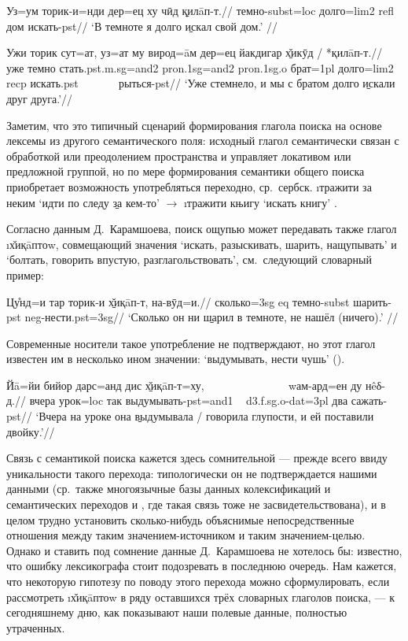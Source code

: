 \begingl
\gla {}Уз=ум торик-и=нди дер=ец ху чӣд \b{қилāп-т}.//
 темно-{\sc subst=loc} долго={\sc lim2} {\sc refl} дом искать-{\sc pst}//
\glft ‘В темноте я долго \b{искал} свой дом.’ //
\endgl \xe

\begingl
\gla Ужи торик сут=ат, уз=ат му вирод=āм дер=ец йакдигар \b{х̌икӯд} / *қилāп-т.//
\glc уже темно стать.{\sc pst.m.sg=and2} {\sc pron.1sg=and2} {\sc pron.1sg.o} брат={\sc 1pl} долго={\sc lim2} {\sc recp} искать.{\sc pst} ~~~~~~ рыться-{\sc pst}//
\glft ‘Уже стемнело, и мы с братом долго \b{искали} друг друга.’//
\endgl \xe

Заметим, что это типичный сценарий формирования глагола поиска на основе лексемы из другого семантического поля: исходный глагол семантически связан с обработкой или преодолением пространства и управляет локативом или предложной группой, но по мере формирования семантики общего поиска приобретает возможность употребляться переходно, ср.~сербск. \i{тражити за неким} ‘идти по следу \b{за} кем-то’ $\rightarrow$ \i{тражити књигу} ‘искать книгу’ \parencites{tolstaya2013}{ryzhova_stankovich2018}.

Согласно данным Д.~Карамшоева, поиск ощупью может передавать также глагол \i{х̌иқāптоw}, совмещающий значения ‘искать, разыскивать, шарить, нащупывать’ и ‘болтать, говорить впустую, разглагольствовать’, см.~следующий словарный пример:

\begingl
\gla Цу̊нд=и тар торик-и \b{х̌иқāп-т}, на-вӯд=и.//
\glc сколько={\sc 3sg} {\sc eq} темно-{\sc subst} шарить-{\sc pst} {\sc neg}-нести.{\sc pst=3sg}//
\glft ‘Сколько он ни \b{шарил} в темноте, не нашёл (ничего).’ //
\endgl \xe

Современные носители такое употребление не подтверждают, но этот глагол известен им в несколько ином значении: ‘выдумывать, нести чушь’ ().

\begingl
\gla Йā=йи бийор дарс=анд дис \b{х̌иқāп-т}=ху, ~~~~~~~~~~~~~~ wам-ард=ен ду нêδ-д.//
 вчера урок={\sc loc} так выдумывать-{\sc pst=and1} ~ {\sc d3.f.sg.o-dat=3pl} два сажать-{\sc pst}//
\glft ‘Вчера на уроке она \b{выдумывала} / говорила глупости, и ей поставили двойку.’//
\endgl \xe

Связь с семантикой поиска кажется здесь сомнительной — прежде всего ввиду уникальности такого перехода: типологически он не подтверждается нашими данными \parencite{eureka2018} (ср.~также многоязычные базы данных колексификаций и семантических переходов \parencite{clics2020} и \parencite{datsemshift}, где такая связь тоже не засвидетельствована), и в целом трудно установить сколько-нибудь объяснимые непосредственные отношения между таким значением-источником и таким значением-целью. Однако и ставить под сомнение данные Д.~Карамшоева не хотелось бы: известно, что ошибку лексикографа стоит подозревать в последнюю очередь. Нам кажется, что некоторую гипотезу по поводу этого перехода можно сформулировать, если рассмотреть \i{х̌иқāптоw} в ряду оставшихся трёх словарных глаголов поиска, — к сегодняшнему дню, как показывают наши полевые данные, полностью утраченных.


